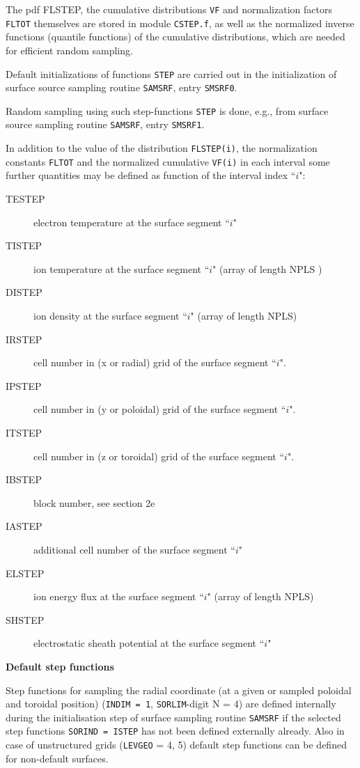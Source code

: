 The pdf FLSTEP, the cumulative distributions \lstinline|VF| and
normalization factors \lstinline|FLTOT| themselves are stored in module
\lstinline|CSTEP.f|, as well as the normalized inverse functions (quantile
functions) of the cumulative distributions, which are needed for efficient
random sampling.

Default initializations of functions \lstinline|STEP| are carried out in
the initialization of surface source sampling routine \lstinline|SAMSRF|,
entry \lstinline|SMSRF0|.

Random sampling using such step-functions \lstinline|STEP| is done,
e.g., from surface source sampling routine \lstinline|SAMSRF|, entry
\lstinline|SMSRF1|.

In addition to the value of the distribution \lstinline|FLSTEP(i)|, the
normalization constants \lstinline|FLTOT| and the normalized cumulative
\lstinline|VF(i)| in each interval some further quantities may be defined
as function of the interval index ``$i$":

\begin{description}
  \item[TESTEP] electron temperature at the surface segment ``$i$"
  \item[TISTEP]
        ion temperature at the surface segment ``$i$" (array of length NPLS )
  \item[DISTEP] ion density at the surface segment ``$i$" (array of length NPLS)
  \item[IRSTEP] cell number in  (x or radial) grid of the surface
        segment ``$i$".
  \item[IPSTEP] cell number in  (y or poloidal) grid of the surface
        segment ``$i$".
  \item[ITSTEP] cell number in  (z or toroidal) grid of the surface
        segment ``$i$".
  \item[IBSTEP] block number, see section 2e
  \item[IASTEP] additional cell number
        of the surface segment ``$i$"
  \item[ELSTEP] ion energy flux at the surface
        segment ``$i$" (array of length NPLS)
  \item[SHSTEP] electrostatic sheath
        potential at the  surface segment ``$i$"
\end{description}

\textbf{Default step functions} 

Step functions for sampling the radial coordinate (at a given or sampled
poloidal and toroidal position) (\lstinline|INDIM = 1|,
\lstinline|SORLIM|-digit N = 4) are defined internally during the
initialisation step of surface sampling routine \lstinline|SAMSRF| if the
selected step functions \lstinline|SORIND = ISTEP| has not been defined externally
already.
Also in case of unstructured grids (\lstinline|LEVGEO| = 4, 5) default
step functions can be defined for non-default surfaces.

